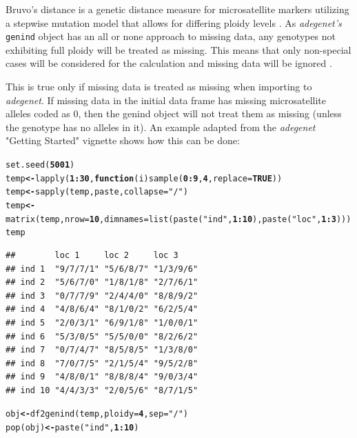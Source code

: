 \documentclass[letterpaper]{article}\usepackage[]{graphicx}\usepackage[]{color}
\makeatletter
\newcommand{\hlnum}[1]{\textcolor[rgb]{0.502,0,0.502}{\textbf{#1}}}%
\newcommand{\hlstr}[1]{\textcolor[rgb]{0.651,0.522,0}{#1}}%
\newcommand{\hlopt}[1]{\textcolor[rgb]{1,0,0.502}{\textbf{#1}}}%
\newcommand{\hlstd}[1]{\textcolor[rgb]{0,0,0}{#1}}%
\newcommand{\hlkwa}[1]{\textcolor[rgb]{0.733,0.475,0.467}{\textbf{#1}}}%
\newcommand{\hlkwb}[1]{\textcolor[rgb]{0.502,0.502,0.753}{\textbf{#1}}}%
\newcommand{\hlkwc}[1]{\textcolor[rgb]{0,0.502,0.753}{#1}}%
\newcommand{\hlkwd}[1]{\textcolor[rgb]{0,0.267,0.4}{#1}}%
\newenvironment{kframe}{%
 \def\at@end@of@kframe{}%
 \ifinner\ifhmode%
  \def\at@end@of@kframe{\end{minipage}}%
  \begin{minipage}{\columnwidth}%
 \fi\fi%
 \def\FrameCommand##1{\hskip\@totalleftmargin \hskip-\fboxsep
 \colorbox{shadecolor}{##1}\hskip-\fboxsep
     \hskip-\linewidth \hskip-\@totalleftmargin \hskip\columnwidth}%
 \MakeFramed {\advance\hsize-\width
   \@totalleftmargin\z@ \linewidth\hsize
   \@setminipage}}%
 {\par\unskip\endMakeFramed%
 \at@end@of@kframe}
\newenvironment{knitrout}{}{} %
\newcommand{\tab}{\hspace*{1em}}
\makeatother
\begin{document}
\tab\tab Bruvo's distance is a genetic distance measure for microsatellite markers utilizing a stepwise mutation model that allows for differing ploidy levels \cite{Bruvo:2004}. As \textit{adegenet's} \texttt{genind} object has an all or none approach to missing data, any genotypes not exhibiting full ploidy will be treated as missing. This means that only non-special cases will be considered for the calculation and missing data will be ignored \cite{Bruvo:2004}.

This is true only if missing data is treated as missing when importing to \textit{adegenet}. If missing data in the initial data frame has missing microsatellite alleles coded as 0, then the genind object will not treat them as missing (unless the genotype has no alleles in it). An example adapted from the \textit{adegenet} "Getting Started" vignette shows how this can be done:

\begin{knitrout}\footnotesize
{}\color{fgcolor}\begin{kframe}
\begin{alltt}
\hlkwd{set.seed}\hlstd{(}\hlnum{5001}\hlstd{)}
\hlstd{temp} \hlkwb{<-} \hlkwd{lapply}\hlstd{(}\hlnum{1}\hlopt{:}\hlnum{30}\hlstd{,} \hlkwa{function}\hlstd{(}\hlkwc{i}\hlstd{)} \hlkwd{sample}\hlstd{(}\hlnum{0}\hlopt{:}\hlnum{9}\hlstd{,} \hlnum{4}\hlstd{,} \hlkwc{replace} \hlstd{=} \hlnum{TRUE}\hlstd{))}
\hlstd{temp} \hlkwb{<-} \hlkwd{sapply}\hlstd{(temp, paste,} \hlkwc{collapse} \hlstd{=} \hlstr{"/"}\hlstd{)}
\hlstd{temp} \hlkwb{<-} \hlkwd{matrix}\hlstd{(temp,} \hlkwc{nrow} \hlstd{=} \hlnum{10}\hlstd{,} \hlkwc{dimnames} \hlstd{=} \hlkwd{list}\hlstd{(}\hlkwd{paste}\hlstd{(}\hlstr{"ind"}\hlstd{,} \hlnum{1}\hlopt{:}\hlnum{10}\hlstd{),} \hlkwd{paste}\hlstd{(}\hlstr{"loc"}\hlstd{,} \hlnum{1}\hlopt{:}\hlnum{3}\hlstd{)))}
\hlstd{temp}
\end{alltt}
\begin{verbatim}
##        loc 1     loc 2     loc 3    
## ind 1  "9/7/7/1" "5/6/8/7" "1/3/9/6"
## ind 2  "5/6/7/0" "1/8/1/8" "2/7/6/1"
## ind 3  "0/7/7/9" "2/4/4/0" "8/8/9/2"
## ind 4  "4/8/6/4" "8/1/0/2" "6/2/5/4"
## ind 5  "2/0/3/1" "6/9/1/8" "1/0/0/1"
## ind 6  "5/3/0/5" "5/5/0/0" "8/2/6/2"
## ind 7  "0/7/4/7" "8/5/8/5" "1/3/8/0"
## ind 8  "7/0/7/5" "2/1/5/4" "9/5/2/8"
## ind 9  "4/8/0/1" "8/8/8/4" "9/0/3/4"
## ind 10 "4/4/3/3" "2/0/5/6" "8/7/1/5"
\end{verbatim}
\begin{alltt}
\hlstd{obj} \hlkwb{<-} \hlkwd{df2genind}\hlstd{(temp,} \hlkwc{ploidy} \hlstd{=} \hlnum{4}\hlstd{,} \hlkwc{sep} \hlstd{=} \hlstr{"/"}\hlstd{)}
\hlkwd{pop}\hlstd{(obj)} \hlkwb{<-} \hlkwd{paste}\hlstd{(}\hlstr{"ind"}\hlstd{,} \hlnum{1}\hlopt{:}\hlnum{10}\hlstd{)}
\end{alltt}
\end{kframe}
\end{knitrout}
\end{document}
